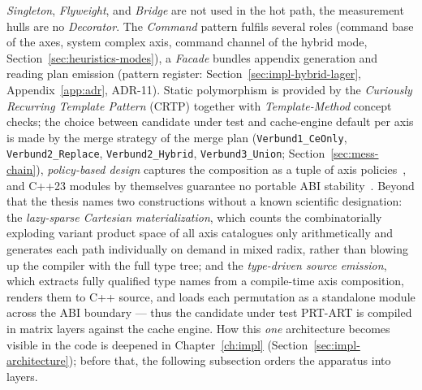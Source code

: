 \begin{nurkurz}
\emph{Singleton}, \emph{Flyweight}, and \emph{Bridge} are not used in the hot path, the measurement hulls
are no \emph{Decorator}. The \emph{Command} pattern fulfils several roles (command base of the axes,
system complex axis, command channel of the hybrid mode, Section~\ref{sec:heuristics-modes}), a
\emph{Facade} bundles appendix generation and reading plan emission (pattern register:
Section~\ref{sec:impl-hybrid-lager}, Appendix~\ref{app:adr}, ADR-11). Static polymorphism is provided by
the \emph{Curiously Recurring Template Pattern} (CRTP) together with \emph{Template-Method} concept
checks; the choice between candidate under test and cache-engine default per axis is made by the merge
strategy of the merge plan (\texttt{Verbund1\_CeOnly}, \texttt{Verbund2\_Replace},
\texttt{Verbund2\_Hybrid}, \texttt{Verbund3\_Union}; Section~\ref{sec:mess-chain}), \emph{policy-based
design} captures the composition as a tuple of axis policies~\cite{alexandrescu2001modern}, and C++23
modules by themselves guarantee no portable ABI stability~\cite{wg21_modules_abi}. Beyond that the thesis
names two constructions without a known scientific designation: the \emph{lazy-sparse Cartesian
materialization}, which counts the combinatorially exploding variant product space of all axis catalogues
only arithmetically and generates each path individually on demand in mixed radix, rather than blowing
up the compiler with the full type tree; and the \emph{type-driven source emission}, which extracts fully
qualified type names from a compile-time axis composition, renders them to C++ source, and loads each
permutation as a standalone module across the ABI boundary --- thus the candidate under test PRT-ART is
compiled in matrix layers against the cache engine. How this \emph{one} architecture becomes visible in
the code is deepened in Chapter~\ref{ch:impl} (Section~\ref{sec:impl-architecture}); before that, the
following subsection orders the apparatus into layers.
\end{nurkurz}

